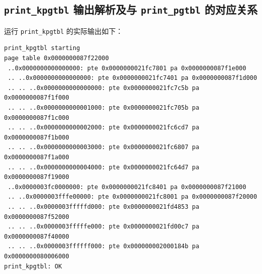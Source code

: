\documentclass[12pt, a4paper]{ctexart}
\begin{document}
\subsection{\texttt{print\_kpgtbl} 输出解析及与 \texttt{print\_pgtbl} 的对应关系}
运行 \texttt{print\_kpgtbl} 的实际输出如下：
\begin{lstlisting}[language={}, caption={\texttt{print\_kpgtbl} 终端输出}]
print_kpgtbl starting
page table 0x0000000087f22000
 ..0x0000000000000000: pte 0x0000000021fc7801 pa 0x0000000087f1e000
 .. ..0x0000000000000000: pte 0x0000000021fc7401 pa 0x0000000087f1d000
 .. .. ..0x0000000000000000: pte 0x0000000021fc7c5b pa 0x0000000087f1f000
 .. .. ..0x0000000000001000: pte 0x0000000021fc705b pa 0x0000000087f1c000
 .. .. ..0x0000000000002000: pte 0x0000000021fc6cd7 pa 0x0000000087f1b000
 .. .. ..0x0000000000003000: pte 0x0000000021fc6807 pa 0x0000000087f1a000
 .. .. ..0x0000000000004000: pte 0x0000000021fc64d7 pa 0x0000000087f19000
 ..0x0000003fc0000000: pte 0x0000000021fc8401 pa 0x0000000087f21000
 .. ..0x0000003fffe00000: pte 0x0000000021fc8001 pa 0x0000000087f20000
 .. .. ..0x0000003fffffd000: pte 0x0000000021fd4853 pa 0x0000000087f52000
 .. .. ..0x0000003fffffe000: pte 0x0000000021fd00c7 pa 0x0000000087f40000
 .. .. ..0x0000003ffffff000: pte 0x000000002000184b pa 0x0000000080006000
print_kpgtbl: OK
\end{lstlisting}
\end{document}

